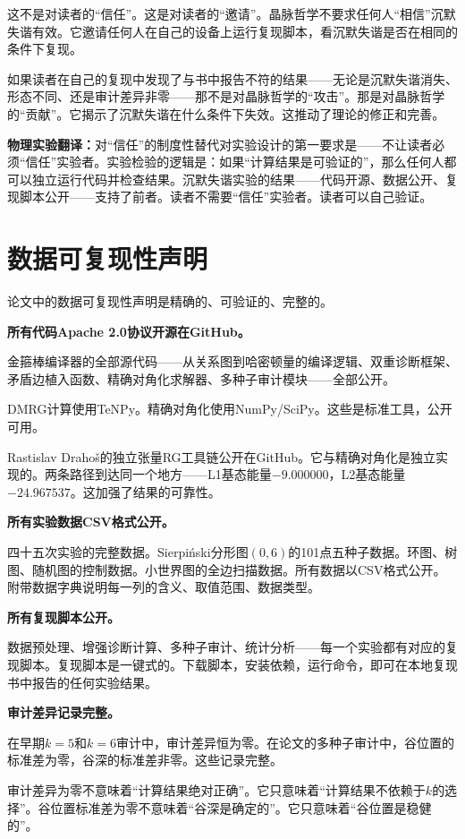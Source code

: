 \documentclass[11pt,a4paper]{book}
\theoremstyle{definition}
\begin{document}
这不是对读者的“信任”。这是对读者的“邀请”。晶脉哲学不要求任何人“相信”沉默失谐有效。它邀请任何人在自己的设备上运行复现脚本，看沉默失谐是否在相同的条件下复现。

如果读者在自己的复现中发现了与书中报告不符的结果——无论是沉默失谐消失、形态不同、还是审计差异非零——那不是对晶脉哲学的“攻击”。那是对晶脉哲学的“贡献”。它揭示了沉默失谐在什么条件下失效。这推动了理论的修正和完善。

\textbf{物理实验翻译：}对“信任”的制度性替代对实验设计的第一要求是——不让读者必须“信任”实验者。实验检验的逻辑是：如果“计算结果是可验证的”，那么任何人都可以独立运行代码并检查结果。沉默失谐实验的结果——代码开源、数据公开、复现脚本公开——支持了前者。读者不需要“信任”实验者。读者可以自己验证。

\section{数据可复现性声明}

论文中的数据可复现性声明是精确的、可验证的、完整的。

\textbf{所有代码Apache 2.0协议开源在GitHub。}

金箍棒编译器的全部源代码——从关系图到哈密顿量的编译逻辑、双重诊断框架、矛盾边植入函数、精确对角化求解器、多种子审计模块——全部公开。

DMRG计算使用TeNPy。精确对角化使用NumPy/SciPy。这些是标准工具，公开可用。

Rastislav Drahoš的独立张量RG工具链公开在GitHub。它与精确对角化是独立实现的。两条路径到达同一个地方——L1基态能量$-9.000000$，L2基态能量$-24.967537$。这加强了结果的可靠性。

\textbf{所有实验数据CSV格式公开。}

四十五次实验的完整数据。Sierpiński分形图$(0,6)$的101点五种子数据。环图、树图、随机图的控制数据。小世界图的全边扫描数据。所有数据以CSV格式公开。附带数据字典说明每一列的含义、取值范围、数据类型。

\textbf{所有复现脚本公开。}

数据预处理、增强诊断计算、多种子审计、统计分析——每一个实验都有对应的复现脚本。复现脚本是一键式的。下载脚本，安装依赖，运行命令，即可在本地复现书中报告的任何实验结果。

\textbf{审计差异记录完整。}

在早期$k=5$和$k=6$审计中，审计差异恒为零。在论文的多种子审计中，谷位置的标准差为零，谷深的标准差非零。这些记录完整。

审计差异为零不意味着“计算结果绝对正确”。它只意味着“计算结果不依赖于$k$的选择”。谷位置标准差为零不意味着“谷深是确定的”。它只意味着“谷位置是稳健的”。
\end{document}
